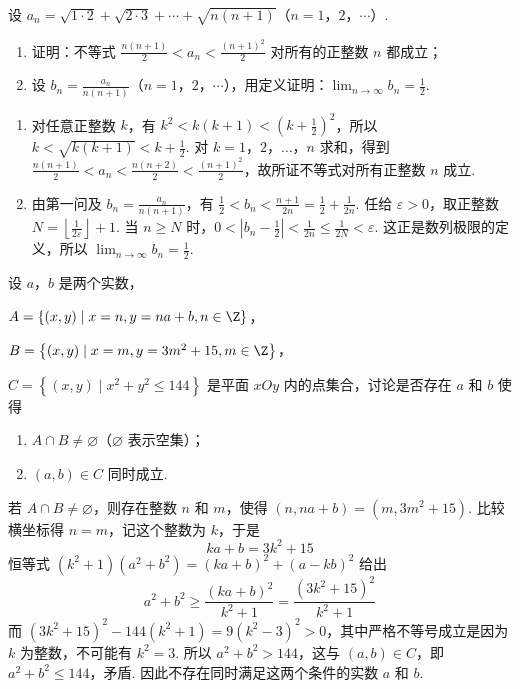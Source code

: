 \documentclass[UTF8,a4paper,oneside,11pt]{ctexbook}
\begin{document}
\begin{problem}

设 \(a_{n}=\sqrt{1\cdot 2}+\sqrt{2\cdot 3}+\cdots+\sqrt{n(n+1)}\)（\(n=1\)，\(2\)，\(\cdots\)）.

\begin{enumerate}
\item 证明：不等式 \(\frac{n(n+1)}{2}<a_n<\frac{(n+1)^2}{2}\) 对所有的正整数 \(n\) 都成立；
\item 设 \(b_n=\frac{a_n}{n(n+1)}\)（\(n=1\)，\(2\)，\(\cdots\)），用定义证明：\(\displaystyle\lim_{n\to\infty}b_n=\frac{1}{2}\).
\end{enumerate}

\begin{solution}
\begin{enumerate}
\item 对任意正整数 \(k\)，有 \(k^2<k(k+1)<\left(k+\frac{1}{2}\right)^2\)，所以 \(k<\sqrt{k(k+1)}<k+\frac{1}{2}\). 对 \(k=1\)，\(2\)，\(\ldots\)，\(n\) 求和，得到 \(\frac{n(n+1)}{2}<a_n<\frac{n(n+2)}{2}<\frac{(n+1)^2}{2}\)，故所证不等式对所有正整数 \(n\) 成立.
\item 由第一问及 \(b_n=\frac{a_n}{n(n+1)}\)，有 \(\frac{1}{2}<b_n<\frac{n+1}{2n}=\frac{1}{2}+\frac{1}{2n}\). 任给 \(\varepsilon>0\)，取正整数 \(N=\left\lfloor\frac{1}{2\varepsilon}\right\rfloor+1\). 当 \(n\geqslant N\) 时，\(0<\left|b_n-\frac{1}{2}\right|<\frac{1}{2n}\leqslant\frac{1}{2N}<\varepsilon\). 这正是数列极限的定义，所以 \(\displaystyle\lim_{n\to\infty}b_n=\frac{1}{2}\).
\end{enumerate}
\end{solution}
\end{problem}

\begin{problem}

设 \(a\)，\(b\) 是两个实数，

\(A = \left\{\left(x, y\right)\mid x = n, y = na + b, n \in \Z\right\}\)，

\(B = \left\{\left(x, y\right)\mid x = m, y = 3m^2 + 15, m \in \Z\right\}\)，

\(C = \left\{(x, y)\mid x^2 + y^2 \leqslant 144\right\}\) 是平面 \(xOy\) 内的点集合，讨论是否存在 \(a\) 和 \(b\) 使得

\begin{enumerate}
\item \(A \cap B \neq \varnothing\)（\(\varnothing\) 表示空集）；
\item \(\left(a,b\right)\in C\) 同时成立.
\end{enumerate}

\begin{solution}
若 \(A\cap B\neq\varnothing\)，则存在整数 \(n\) 和 \(m\)，使得 \((n,na+b)=(m,3m^2+15)\). 比较横坐标得 \(n=m\)，记这个整数为 \(k\)，于是
\[
ka+b=3k^2+15
\]
恒等式 \((k^2+1)(a^2+b^2)=(ka+b)^2+(a-kb)^2\) 给出
\[
a^2+b^2\geqslant\frac{(ka+b)^2}{k^2+1}=\frac{(3k^2+15)^2}{k^2+1}
\]
而 \((3k^2+15)^2-144(k^2+1)=9(k^2-3)^2>0\)，其中严格不等号成立是因为 \(k\) 为整数，不可能有 \(k^2=3\). 所以 \(a^2+b^2>144\)，这与 \((a,b)\in C\)，即 \(a^2+b^2\leqslant144\)，矛盾. 因此不存在同时满足这两个条件的实数 \(a\) 和 \(b\).
\end{solution}
\end{problem}
\end{document}
